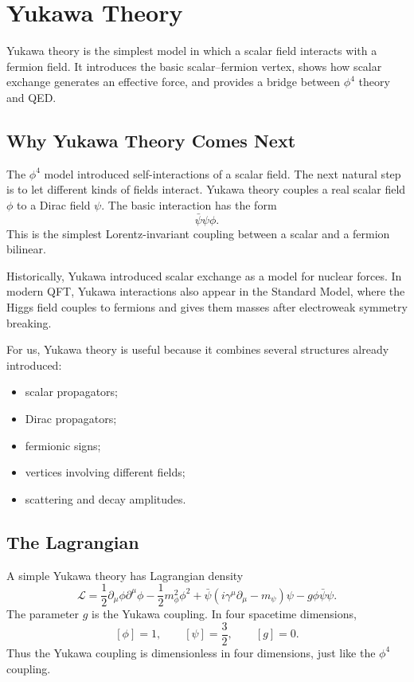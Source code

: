 \chapter{Yukawa Theory}

\begin{remarkbox}
Yukawa theory is the simplest model in which a scalar field interacts with a
fermion field. It introduces the basic scalar--fermion vertex, shows how scalar
exchange generates an effective force, and provides a bridge between \(\phi^4\)
theory and QED.
\end{remarkbox}

\section{Why Yukawa Theory Comes Next}

The \(\phi^4\) model introduced self-interactions of a scalar field. The next
natural step is to let different kinds of fields interact. Yukawa theory couples
a real scalar field \(\phi\) to a Dirac field \(\psi\). The basic interaction has
the form
\[
    \bar\psi\psi\phi.
\]
This is the simplest Lorentz-invariant coupling between a scalar and a fermion
bilinear.

Historically, Yukawa introduced scalar exchange as a model for nuclear forces.
In modern QFT, Yukawa interactions also appear in the Standard Model, where the
Higgs field couples to fermions and gives them masses after electroweak symmetry
breaking.

For us, Yukawa theory is useful because it combines several structures already
introduced:
\begin{itemize}
    \item scalar propagators;
    \item Dirac propagators;
    \item fermionic signs;
    \item vertices involving different fields;
    \item scattering and decay amplitudes.
\end{itemize}

\section{The Lagrangian}

A simple Yukawa theory has Lagrangian density
\[
    \mathcal{L}
    = \frac{1}{2}\partial_\mu\phi\partial^\mu\phi
      -\frac{1}{2}m_\phi^2\phi^2
      +\bar\psi(i\gamma^\mu\partial_\mu-m_\psi)\psi
      -g\phi\bar\psi\psi.
\]
The parameter \(g\) is the Yukawa coupling. In four spacetime dimensions,
\[
    [\phi]=1,
    \qquad
    [\psi]=\frac{3}{2},
    \qquad
    [g]=0.
\]
Thus the Yukawa coupling is dimensionless in four dimensions, just like the
\(\phi^4\) coupling.

